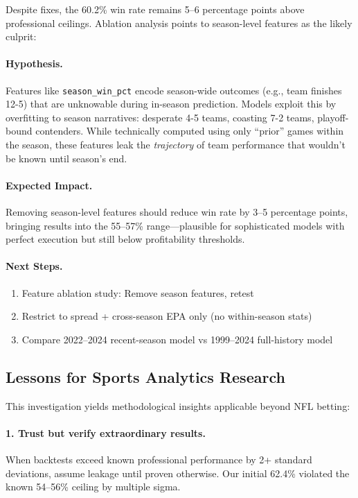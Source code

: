Despite fixes, the 60.2\% win rate remains 5--6 percentage points above professional ceilings. Ablation analysis points to season-level features as the likely culprit:

\paragraph{Hypothesis.}
Features like \texttt{season\_win\_pct} encode season-wide outcomes (e.g., team finishes 12-5) that are unknowable during in-season prediction. Models exploit this by overfitting to season narratives: desperate 4-5 teams, coasting 7-2 teams, playoff-bound contenders. While technically computed using only ``prior'' games within the season, these features leak the \emph{trajectory} of team performance that wouldn't be known until season's end.

\paragraph{Expected Impact.}
Removing season-level features should reduce win rate by 3--5 percentage points, bringing results into the 55--57\% range---plausible for sophisticated models with perfect execution but still below profitability thresholds.

\paragraph{Next Steps.}
\begin{enumerate}
  \item Feature ablation study: Remove season features, retest
  \item Restrict to spread + cross-season EPA only (no within-season stats)
  \item Compare 2022--2024 recent-season model vs 1999--2024 full-history model
\end{enumerate}

\subsection{Lessons for Sports Analytics Research}

This investigation yields methodological insights applicable beyond NFL betting:

\paragraph{1. Trust but verify extraordinary results.}
When backtests exceed known professional performance by 2+ standard deviations, assume leakage until proven otherwise. Our initial 62.4\% violated the known 54--56\% ceiling by multiple sigma.

